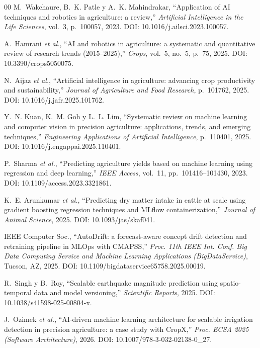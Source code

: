 \documentclass[conference]{IEEEtran}
\begin{document}
\begin{thebibliography}{00}
M.~Wakchaure, B.~K. Patle y A.~K. Mahindrakar, ``Application of AI techniques and robotics in agriculture: a review,''
\textit{Artificial Intelligence in the Life Sciences}, vol.~3, p.~100057, 2023.
DOI: 10.1016/j.ailsci.2023.100057.

A.~Hamrani \textit{et al.}, ``AI and robotics in agriculture: a systematic and quantitative review of research trends (2015--2025),''
\textit{Crops}, vol.~5, no.~5, p.~75, 2025.
DOI: 10.3390/crops5050075.

N.~Aijaz \textit{et al.}, ``Artificial intelligence in agriculture: advancing crop productivity and sustainability,''
\textit{Journal of Agriculture and Food Research}, p.~101762, 2025.
DOI: 10.1016/j.jafr.2025.101762.

Y.~N. Kuan, K.~M. Goh y L.~L. Lim, ``Systematic review on machine learning and computer vision in precision agriculture: applications, trends, and emerging techniques,''
\textit{Engineering Applications of Artificial Intelligence}, p.~110401, 2025.
DOI: 10.1016/j.engappai.2025.110401.

P.~Sharma \textit{et al.}, ``Predicting agriculture yields based on machine learning using regression and deep learning,''
\textit{IEEE Access}, vol.~11, pp.~101416--101430, 2023.
DOI: 10.1109/access.2023.3321861.

K.~E. Arunkumar \textit{et al.}, ``Predicting dry matter intake in cattle at scale using gradient boosting regression techniques and MLflow containerization,''
\textit{Journal of Animal Science}, 2025.
DOI: 10.1093/jas/skaf041.

IEEE Computer Soc., ``AutoDrift: a forecast-aware concept drift detection and retraining pipeline in MLOps with CMAPSS,''
\textit{Proc. 11th IEEE Int. Conf. Big Data Computing Service and Machine Learning Applications (BigDataService)}, Tucson, AZ, 2025.
DOI: 10.1109/bigdataservice65758.2025.00019.

R.~Singh y B.~Roy, ``Scalable earthquake magnitude prediction using spatio-temporal data and model versioning,''
\textit{Scientific Reports}, 2025.
DOI: 10.1038/s41598-025-00804-x.

J.~Ozimek \textit{et al.}, ``AI-driven machine learning architecture for scalable irrigation detection in precision agriculture: a case study with CropX,''
\textit{Proc. ECSA 2025 (Software Architecture)}, 2026.
DOI: 10.1007/978-3-032-02138-0\_27.


\end{thebibliography}
\end{document}
